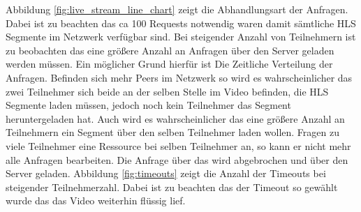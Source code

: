 Abbildung \ref{fig:live_stream_line_chart} zeigt die Abhandlungsart der Anfragen. Dabei ist zu beachten das ca 100 Requests notwendig waren damit sämtliche HLS Segmente im \pTp Netzwerk verfügbar sind. Bei steigender Anzahl von Teilnehmern ist zu beobachten das eine größere Anzahl an Anfragen über den Server geladen werden müssen. Ein möglicher Grund hierfür ist Die Zeitliche Verteilung der Anfragen. Befinden sich mehr Peers im Netzwerk so wird es wahrscheinlicher das zwei Teilnehmer sich beide an der selben Stelle im Video befinden, die HLS Segmente laden müssen, jedoch noch kein Teilnehmer das Segment heruntergeladen hat. Auch wird es wahrscheinlicher das eine größere Anzahl an Teilnehmern ein Segment über den selben Teilnehmer laden wollen. Fragen zu viele Teilnehmer eine Ressource bei selben Teilnehmer an, so kann er nicht mehr alle Anfragen bearbeiten. Die Anfrage über das \pTp \cdn wird abgebrochen und über den Server geladen. Abbildung \ref{fig:timeouts} zeigt die Anzahl der Timeouts bei steigender Teilnehmerzahl. Dabei ist zu beachten das der Timeout so gewählt wurde das das Video weiterhin flüssig lief.

